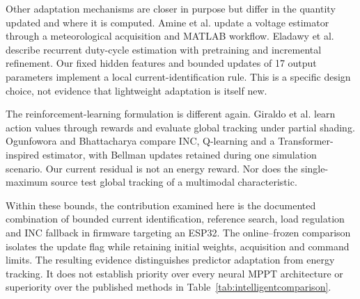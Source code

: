 \documentclass[Acad.Energy.,researcharticle,9pt,twoside,oneauthor]{Definitions/jams_academia}
\begin{document}
Other adaptation mechanisms are closer in purpose but differ in the quantity updated and where it is computed. Amine et al. \cite{amine} update a voltage estimator through a meteorological acquisition and MATLAB workflow. Eladawy et al. \cite{eladawy2026} describe recurrent duty-cycle estimation with pretraining and incremental refinement. Our fixed hidden features and bounded updates of 17 output parameters implement a local current-identification rule. This is a specific design choice, not evidence that lightweight adaptation is itself new.

The reinforcement-learning formulation is different again. Giraldo et al. \cite{giraldo} learn action values through rewards and evaluate global tracking under partial shading. Ogunfowora and Bhattacharya \cite{ogunfowora} compare INC, Q-learning and a Transformer-inspired estimator, with Bellman updates retained during one simulation scenario. Our current residual is not an energy reward. Nor does the single-maximum source test global tracking of a multimodal characteristic.

Within these bounds, the contribution examined here is the documented combination of bounded current identification, reference search, load regulation and INC fallback in firmware targeting an ESP32. The online--frozen comparison isolates the update flag while retaining initial weights, acquisition and command limits. The resulting evidence distinguishes predictor adaptation from energy tracking. It does not establish priority over every neural MPPT architecture or superiority over the published methods in Table~\ref{tab:intelligentcomparison}.
\end{document}
